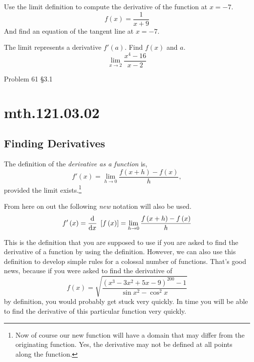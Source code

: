\documentclass[12pt,addpoints, answers, fleqn]{exam}
\begin{document}
\begin{teacher}
\begin{questions}
\question 	%

Use the limit definition to compute the derivative of the function at $x = -7$.
\[
f\left(x\right) = \frac{1}{x+9}
\]
And find an equation of the tangent line at $x = -7$.

\question 	%

The limit represents a derivative $f'\left(a\right)$. Find $f\left(x\right)$ and $a$.
\[
\lim_{x \to 2} \frac{x^4-16}{x-2}
\]

\question 	%

Problem 61 \S3.1

\end{questions}
\end{teacher}

\vfill
\pagebreak

\section{mth.121.03.02}
\subsection{Finding Derivatives}


The definition of the \emph{derivative as a function} is,
\[
f' \left( x \right) = \mathop {\lim }\limits_{h \to 0 }  \frac{f \left( x+h \right) - f \left( x \right)}{h},
\]
provided the limit exists.\footnote{Now of course our new function will have a domain that may differ from the originating function. Yes, the derivative may not be defined at all points along the function.}



From here on out the following \emph{new} notation will also be used.
\[
f' \left( x \right) = \frac{{\rm{d}}}{{\rm{d}}x} \ \left[ f \left( x \right) \right] = \mathop {\lim }\limits_{h \to 0 }  \frac{f \left( x+h \right) - f \left( x \right)}{h}
\]


This is the definition that you are supposed to use if you are asked to find the derivative of a function by using the definition. However, we can also use this definition to develop simple rules for a colossal number of functions. That's good news, because if you were asked to find the derivative of
\[
f \left( x \right) = \sqrt{ \frac{ \left(x^3-3x^2+5x-9\right)^{200} - 1 }{ \sin x^2 - \cos^2 x } } 
\]
by definition, you would probably get stuck very quickly. In time you will be able to find the derivative of this particular function very quickly.
\end{document}
